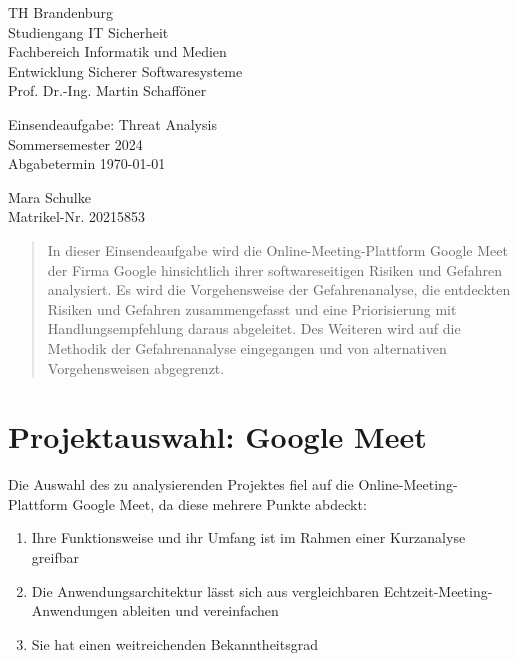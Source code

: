 \documentclass{article}
\begin{document}
\begin{titlepage}
	\begin{flushleft}
		TH Brandenburg \\
		Studiengang IT Sicherheit \\
		Fachbereich Informatik und Medien \\
		Entwicklung Sicherer Softwaresysteme \\
		Prof. Dr.-Ing. Martin Schafföner
	\end{flushleft}

	\vfill

	\begin{center}
		\Large{Einsendeaufgabe: Threat Analysis}\\[0.5em]
		\large{Sommersemester 2024}\\[0.25em]
		\large{Abgabetermin \today}
	\end{center}

	\vfill

	\begin{flushright}
		Mara Schulke \\
		Matrikel-Nr. 20215853
	\end{flushright}
\end{titlepage}

\begin{abstract}
	In dieser Einsendeaufgabe wird die Online-Meeting-Plattform Google Meet der Firma 
	Google hinsichtlich ihrer softwareseitigen Risiken und Gefahren analysiert.
	Es wird die Vorgehensweise der Gefahrenanalyse, die entdeckten Risiken und Gefahren 
	zusammengefasst und eine Priorisierung mit Handlungsempfehlung daraus abgeleitet. Des 
	Weiteren wird auf die Methodik der Gefahrenanalyse eingegangen und von alternativen 
	Vorgehensweisen abgegrenzt.
\end{abstract}

\tableofcontents

\listoffigures

\section{Projektauswahl: Google Meet}

Die Auswahl des zu analysierenden Projektes fiel auf die Online-Meeting-Plattform Google 
Meet, da diese mehrere Punkte abdeckt:

\begin{enumerate}
	\item Ihre Funktionsweise und ihr Umfang ist im Rahmen einer Kurzanalyse greifbar
	\item Die Anwendungsarchitektur lässt sich aus vergleichbaren Echtzeit-Meeting-Anwendungen ableiten und vereinfachen
	\item Sie hat einen weitreichenden Bekanntheitsgrad
\end{enumerate}
\end{document}
